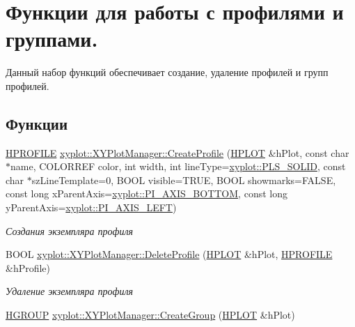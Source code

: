 \hypertarget{group__gr_output}{\section{Функции для работы с профилями и группами.}
\label{group__gr_output}
}


Данный набор функций обеспечивает создание, удаление профилей и групп профилей.  


\subsection*{Функции}
\begin{DoxyCompactItemize}
\item 
\hyperlink{classxyplot_1_1_h_p_r_o_f_i_l_e}{H\-P\-R\-O\-F\-I\-L\-E} \hyperlink{group__gr_output_ga0b66f2af6d72e28697ea2404362bcd08}{xyplot\-::\-X\-Y\-Plot\-Manager\-::\-Create\-Profile} (\hyperlink{classxyplot_1_1_h_p_l_o_t}{H\-P\-L\-O\-T} \&h\-Plot, const char $\ast$name, C\-O\-L\-O\-R\-R\-E\-F color, int width, int line\-Type=\hyperlink{namespacexyplot_a3d67107a3da8dc1ef0114ab0352e01eda50f3326c8ff8eb69d629156dfe2e268a}{xyplot\-::\-P\-L\-S\-\_\-\-S\-O\-L\-I\-D}, const char $\ast$sz\-Line\-Template=0, B\-O\-O\-L visible=T\-R\-U\-E, B\-O\-O\-L showmarks=F\-A\-L\-S\-E, const long x\-Parent\-Axis=\hyperlink{namespacexyplot_aab624afb50724c293bffe01fff26c9c2ae9a92ae30b1ebc969b6a7256f1511924}{xyplot\-::\-P\-I\-\_\-\-A\-X\-I\-S\-\_\-\-B\-O\-T\-T\-O\-M}, const long y\-Parent\-Axis=\hyperlink{namespacexyplot_aab624afb50724c293bffe01fff26c9c2a5cab3df16a4e44f280dec6a0108dc09d}{xyplot\-::\-P\-I\-\_\-\-A\-X\-I\-S\-\_\-\-L\-E\-F\-T})
\begin{DoxyCompactList}\small\item\em Создания экземпляра профиля \end{DoxyCompactList}\item 
B\-O\-O\-L \hyperlink{group__gr_output_gaa5a7b664a3f8dbc02402bd1a8926b4c6}{xyplot\-::\-X\-Y\-Plot\-Manager\-::\-Delete\-Profile} (\hyperlink{classxyplot_1_1_h_p_l_o_t}{H\-P\-L\-O\-T} \&h\-Plot, \hyperlink{classxyplot_1_1_h_p_r_o_f_i_l_e}{H\-P\-R\-O\-F\-I\-L\-E} \&h\-Profile)
\begin{DoxyCompactList}\small\item\em Удаление экземпляра профиля \end{DoxyCompactList}\item 
\hyperlink{classxyplot_1_1_h_g_r_o_u_p}{H\-G\-R\-O\-U\-P} \hyperlink{group__gr_output_gaa9973935dcf6968295717ca9e8e832c0}{xyplot\-::\-X\-Y\-Plot\-Manager\-::\-Create\-Group} (\hyperlink{classxyplot_1_1_h_p_l_o_t}{H\-P\-L\-O\-T} \&h\-Plot)

\end{DoxyCompactItemize}
